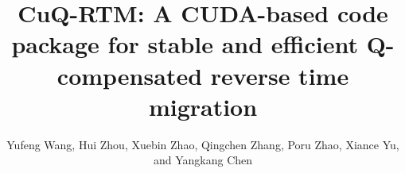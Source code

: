 
\title{CuQ-RTM: A CUDA-based code package for stable and efficient Q-compensated reverse time migration}

\renewcommand{\thefootnote}{\fnsymbol{footnote}}

\author{Yufeng Wang\footnotemark[1], Hui Zhou\footnotemark[1], Xuebin Zhao\footnotemark[1], Qingchen Zhang\footnotemark[2], Poru Zhao\footnotemark[3], Xiance Yu\footnotemark[3], and Yangkang Chen\footnotemark[4]}
\address{
\footnotemark[1] State Key Laboratory of Petroleum Resources and Prospecting \\
China University of Petroleum \\
Fuxue Road 18th\\
Beijing, China, 102200 \\
\footnotemark[2]Research Center for Computational and Exploration Geophysics\\
 State Key Laboratory of Geodesy and Earth’s Dynamics\\
  Institute of Geodesy and Geophysics\\
   Chinese Academy of Sciences\\
    Wuhan, Hubei Province, China, 430077\\
\footnotemark[3]
China National Petroleum Corporation\\
Beijing, China. \\
\footnotemark[4]
School of Earth Sciences\\
Zhejiang University\\
Hangzhou, Zhejiang Province, China, 310027\\
yangkang.chen@zju.edu.cn 
}


\maketitle

